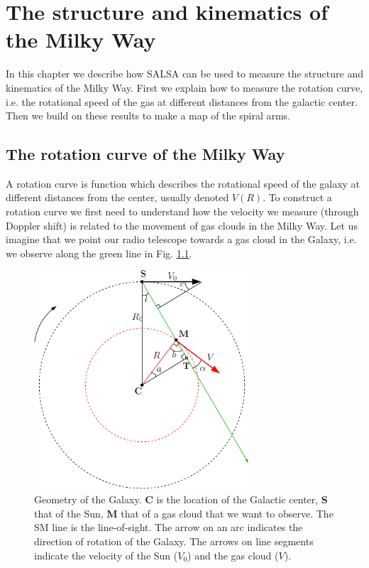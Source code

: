 \chapter{The structure and kinematics of the Milky Way}
In this chapter we describe how SALSA can be used to measure the structure
and kinematics of the Milky Way. First we explain how to measure the rotation curve,
i.e. the rotational speed of the gas at different distances from the galactic center. 
Then we build on these results to make a map of the spiral arms.

\section{The rotation curve of the Milky Way}
A rotation curve is function which describes the rotational speed of the galaxy
at different distances from the center, usually denoted $V(R)$. 
To construct a rotation curve we first need to understand how the velocity we
measure (through Doppler shift) is related to the movement of gas clouds in the
Milky Way. Let us imagine that we point our radio telescope towards a gas cloud
in the Galaxy, i.e. we observe along the green line in Fig. \ref{fig:galgeom}.
\begin{figure}[ht]
\begin{center}
\includegraphics[width=8cm]{../figures/galgeom.pdf}
\end{center}
\caption{Geometry of the Galaxy. {\bf C} is the location of the Galactic center, 
{\bf S} that of the Sun, {\bf M} that of a gas cloud that we want to observe. 
The SM line is the line-of-sight. The arrow on an arc indicates the direction 
of rotation of the Galaxy. The arrows on line segments indicate the
velocity of the Sun ($V_0$) and the gas cloud ($V$).}
\label{fig:galgeom}
\end{figure}  
